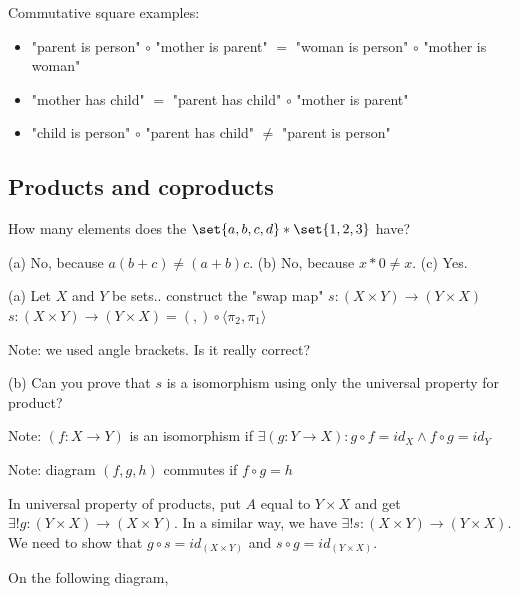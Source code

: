 \documentclass{article}
\begin{document}
Commutative square examples:
\begin{itemize}
\item "parent is person" $\circ$ "mother is parent" $=$ "woman is person" $\circ$ "mother is woman"
\item "mother has child" $=$ "parent has child" $\circ$ "mother is parent"
\item "child is person" $\circ$ "parent has child" $\ne$ "parent is person"
\end{itemize}

\setcounter{subsection}{3}
\subsection{Products and coproducts}

How many elements does the $\set{a,b,c,d} * \set{1,2,3}$ have?

\ans
(a) No, because $a(b + c) \neq (a+b)c$.
\vsp
(b) No, because $x*0 \neq x$.
\vsp
(c) Yes.


(a) Let $X$ and $Y$ be sets.. construct the "swap map" $s:(X \times Y)\to(Y \times X)$
\ans
$s:(X \times Y)\to(Y \times X) = (,)\circ\langle\pi_2,\pi_1\rangle$

Note: we used angle brackets. Is it really correct?

\vsp
(b) Can you prove that $s$ is a isomorphism using only the universal property for product?

Note: $(f:X \to Y)$ is an isomorphism if $\exists (g:Y \to X): g \circ f = id_X \land f \circ g =
id_Y$

Note: diagram $(f,g,h)$ commutes if $f \circ g = h$
\ans

In universal property of products, put $A$ equal to $Y \times X$ and get $\exists !
g:(Y \times X)\to(X \times Y)$. In a similar way, we have $\exists! s:(X \times Y)\to(Y \times X)$.
We need to show that $g \circ s = id_{(X \times Y)}$ and $s \circ g = id_{(Y\times X)}$.

On the following diagram,

\end{document}
